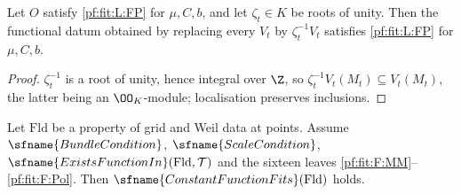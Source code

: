 \begin{lemma}\label{pf:fit:rootunity}
Let $O$ satisfy \ref{pf:fit:L:FP} for $\mu,C,b$, and let $\zeta_t\in K$ be roots of unity. Then the functional datum
obtained by replacing every $V_t$ by $\zeta_t^{-1}V_t$ satisfies \ref{pf:fit:L:FP} for $\mu,C,b$.
\end{lemma}

\begin{proof}
$\zeta_t^{-1}$ is a root of unity, hence integral over $\Z$, so $\zeta_t^{-1}V_t(M_t)\subseteq V_t(M_t)$, the latter being an
$\OO_K$-module; localisation preserves inclusions.
\end{proof}

\begin{theorem}\label{pf:fit:leaves}
Let $\mathrm{Fld}$ be a property of grid and Weil data at points. Assume $\sfname{BundleCondition}$,
$\sfname{ScaleCondition}$, $\sfname{ExistsFunctionIn}(\mathrm{Fld},\mathcal T)$ and the sixteen leaves
\ref{pf:fit:F:MM}--\ref{pf:fit:F:Pol}. Then $\sfname{ConstantFunctionFits}(\mathrm{Fld})$ holds.
\end{theorem}

